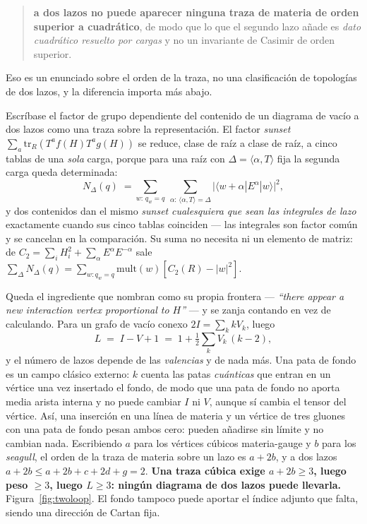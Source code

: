 \documentclass[11pt,a4paper]{article}
\begin{document}
\begin{quote}
\textbf{a dos lazos no puede aparecer ninguna traza de materia de orden superior a cuadrático}, de
modo que lo que el segundo lazo añade es \emph{dato cuadrático resuelto por cargas} y no un
invariante de Casimir de orden superior.
\end{quote}

\noindent
Eso es un enunciado sobre el orden de la traza, no una clasificación de topologías de dos lazos, y
la diferencia importa más abajo.

Escríbase el factor de grupo dependiente del contenido de un diagrama de vacío a dos lazos como una
traza sobre la representación. El factor \emph{sunset} $\sum_a\mathrm{tr}_R(T^a f(H) T^a g(H))$ se
reduce, clase de raíz a clase de raíz, a cinco tablas de una \emph{sola} carga, porque para una raíz
con $\Delta=\langle\alpha,T\rangle$ fija la segunda carga queda determinada:
\[
  N_\Delta(q)\;=\!\!\sum_{w:\,q_w=q}\ \sum_{\alpha:\,\langle\alpha,T\rangle=\Delta}
  \bigl|\langle w+\alpha|E^\alpha|w\rangle\bigr|^2 ,
\]
y dos contenidos dan el mismo \emph{sunset} \emph{cualesquiera que sean las integrales de lazo}
exactamente cuando sus cinco tablas coinciden --- las integrales son factor común y se cancelan en la
comparación. Su suma no necesita ni un elemento de matriz: de
$C_2=\sum_i H_i^2+\sum_\alpha E^\alpha E^{-\alpha}$ sale
$\sum_\Delta N_\Delta(q)=\sum_{w:q_w=q}\mathrm{mult}(w)[C_2(R)-|w|^2]$.

Queda el ingrediente que \cite{HMTY} nombran como su propia frontera --- \emph{``there appear a new
interaction vertex proportional to $H$''} --- y se zanja contando en vez de calculando. Para un grafo
de vacío conexo $2I=\sum_k kV_k$, luego
\[
  L \;=\; I-V+1 \;=\; 1+\tfrac12\sum_k V_k\,(k-2),
\]
y el número de lazos depende de las \emph{valencias} y de nada más. Una pata de fondo es un campo
clásico externo: $k$ cuenta las patas \emph{cuánticas} que entran en un vértice una vez insertado el
fondo, de modo que una pata de fondo no aporta media arista interna y no puede cambiar $I$ ni $V$,
aunque sí cambia el tensor del vértice. Así, una inserción en una línea de materia y un vértice
de tres gluones con una pata de fondo pesan ambos cero: pueden añadirse sin límite y no cambian nada.
Escribiendo $a$ para los vértices cúbicos materia-gauge y $b$ para los \emph{seagull}, el orden de la
traza de materia sobre un lazo es $a+2b$, y a dos lazos $a+2b\le a+2b+c+2d+g=2$. \textbf{Una traza
cúbica exige $a+2b\ge3$, luego peso $\ge3$, luego $L\ge3$: ningún diagrama de dos lazos puede
llevarla.} Figura~\ref{fig:twoloop}. El fondo tampoco puede aportar el índice adjunto que falta,
siendo una dirección de Cartan fija.
\end{document}
